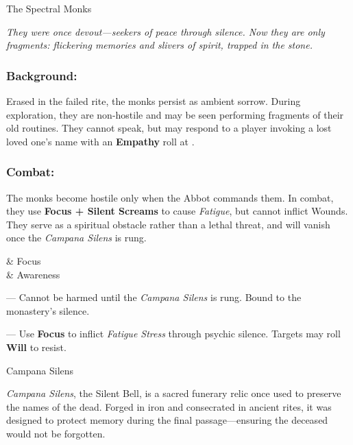 \BeginBoxPage
\begin{multicols}{2}
\begin{NPC}[%
	description=Lingering echoes bound in silence,%
]{The Spectral Monks}

    \raggedright

    \emph{They were once devout—seekers of peace through silence. Now they are only fragments: flickering memories and slivers of spirit, trapped in the stone. }

    \subsubsection*{Background:}
    Erased in the failed rite, the monks persist as ambient sorrow. During exploration, they are non-hostile and may be seen performing fragments of their old routines. They cannot speak, but may respond to a player invoking a lost loved one’s name with an \textbf{Empathy} roll at .

    \subsubsection*{Combat:}
    The monks become hostile only when the Abbot commands them. In combat, they use \textbf{Focus + Silent Screams} to cause \emph{Fatigue}, but cannot inflict Wounds. They serve as a spiritual obstacle rather than a lethal threat, and will vanish once the \emph{Campana Silens} is rung.

    \vspace{0.5\baselineskip}

    \begin{SkillsBox}
        \Skilled & Focus \\
        \Novice & Awareness \\
    \end{SkillsBox}

    \begin{TraitsBox}
        \item[Spectral Silence] — Cannot be harmed until the \emph{Campana Silens} is rung. Bound to the monastery's silence.
        \item[Silent Screams] — Use \textbf{Focus} to inflict \emph{Fatigue Stress} through psychic silence. Targets may roll \textbf{Will} to resist.
    \end{TraitsBox}

\end{NPC}

\enlargethispage{\baselineskip}
\vspace{\baselineskip}
\begin{CommentBox}{Campana Silens}\raggedright
    \emph{Campana Silens}, the Silent Bell, is a sacred funerary relic once used to preserve the names of the dead. Forged in iron and consecrated in ancient rites, it was designed to protect memory during the final passage—ensuring the deceased would not be forgotten.
    

\end{CommentBox}
\end{multicols}
